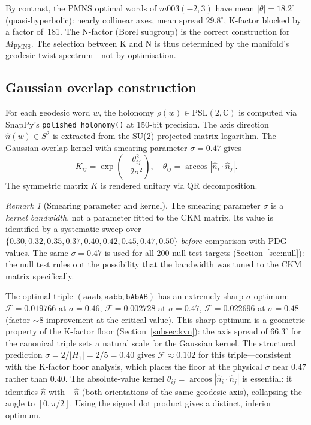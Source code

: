 \documentclass[11pt,a4paper]{article}
\theoremstyle{remark}
\newtheorem{remark}[theorem]{Remark}
\newcommand{\MPMNS}{M_{\mathrm{PMNS}}}
\newcommand{\CC}{\mathbb{C}}
\newcommand{\PSL}{\mathrm{PSL}(2,\CC)}
\begin{document}
By contrast, the PMNS optimal words of $m003(-2,3)$ have mean $|\theta| = 18.2^\circ$
(quasi-hyperbolic): nearly collinear axes, mean spread $29.8^\circ$,
K-factor blocked by a factor of~181.
The N-factor (Borel subgroup) is the correct construction for $\MPMNS$.
The selection between K and N is thus determined by the manifold's
geodesic twist spectrum---not by optimisation.


\label{sec:ckm}

\subsection{Gaussian overlap construction}

For each geodesic word $w$, the holonomy $\rho(w) \in \PSL$
is computed via SnapPy's \texttt{polished\_\allowbreak holonomy()}
at 150-bit precision.
The axis direction $\hat{n}(w) \in S^2$ is extracted from the
SU(2)-projected matrix logarithm.
The Gaussian overlap kernel with smearing parameter $\sigma = 0.47$ gives
\[
K_{ij} = \exp\!\left(-\frac{\theta_{ij}^2}{2\sigma^2}\right),
\quad
\theta_{ij} = \arccos|\hat{n}_i \cdot \hat{n}_j|.
\]
The symmetric matrix $K$ is rendered unitary via QR decomposition.

\begin{remark}[Smearing parameter and kernel]
The smearing parameter $\sigma$ is a \emph{kernel bandwidth}, not a
parameter fitted to the CKM matrix.
Its value is identified by a systematic sweep over
$\{0.30, 0.32, 0.35, 0.37, 0.40, 0.42, 0.45, 0.47, 0.50\}$
\emph{before} comparison with PDG values.
The same $\sigma = 0.47$ is used for all 200 null-test targets
(Section~\ref{sec:null}): the null test rules out the possibility
that the bandwidth was tuned to the CKM matrix specifically.

The optimal triple $(\mathtt{aaab}, \mathtt{aabb}, \mathtt{bAbAB})$ has an
extremely sharp $\sigma$-optimum: $\mathcal{F} = 0.019766$ at $\sigma=0.46$,
$\mathcal{F} = 0.002728$ at $\sigma = 0.47$, $\mathcal{F} = 0.022696$ at
$\sigma=0.48$ (factor $\sim 8$ improvement at the critical value).
This sharp optimum is a geometric property of the K-factor floor
(Section~\ref{subsec:kvn}): the axis spread of $66.3^\circ$ for the
canonical triple sets a natural scale for the Gaussian kernel.
The structural prediction $\sigma = 2/|H_1| = 2/5 = 0.40$ gives
$\mathcal{F} \approx 0.102$ for this triple---consistent with the
K-factor floor analysis, which places the floor at the physical $\sigma$
near $0.47$ rather than $0.40$.
The absolute-value kernel $\theta_{ij} = \arccos|\hat{n}_i \cdot \hat{n}_j|$
is essential: it identifies $\hat{n}$ with $-\hat{n}$ (both orientations of
the same geodesic axis), collapsing the angle to $[0,\pi/2]$.
Using the signed dot product gives a distinct, inferior optimum.
\end{remark}
\end{document}

